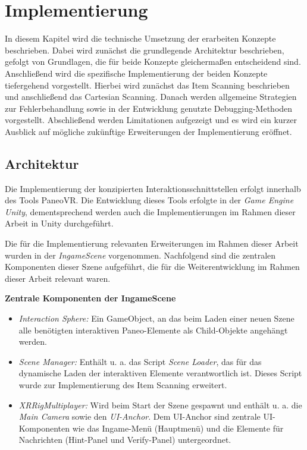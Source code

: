\chapter{Implementierung}
\label{chap:Implementierung}


In diesem Kapitel wird die technische Umsetzung der erarbeiten Konzepte beschrieben. Dabei wird zunächst die grundlegende Architektur beschrieben, gefolgt von Grundlagen, die für beide Konzepte gleichermaßen entscheidend sind. Anschließend wird die spezifische Implementierung der beiden Konzepte tiefergehend vorgestellt. Hierbei wird zunächst das Item Scanning beschrieben und anschließend das Cartesian Scanning. Danach werden allgemeine Strategien zur Fehlerbehandlung sowie in der Entwicklung genutzte Debugging-Methoden vorgestellt. Abschließend werden Limitationen aufgezeigt und es wird ein kurzer Ausblick auf mögliche zukünftige Erweiterungen der Implementierung eröffnet. 

\section{Architektur}
Die Implementierung der konzipierten Interaktionsschnittstellen erfolgt innerhalb des Tools PaneoVR. Die Entwicklung dieses Tools erfolgte in der \textit{Game Engine Unity}, dementsprechend werden auch die Implementierungen im Rahmen dieser Arbeit in Unity durchgeführt. 

Die für die Implementierung relevanten Erweiterungen im Rahmen dieser Arbeit wurden in der \textit{IngameScene} vorgenommen. Nachfolgend sind die zentralen Komponenten dieser Szene aufgeführt, die für die Weiterentwicklung im Rahmen dieser Arbeit relevant waren. 

{\normalfont \bfseries Zentrale Komponenten der IngameScene}

\begin{itemize}
    \item \textit{Interaction Sphere:} Ein GameObject, an das beim Laden einer neuen Szene alle benötigten interaktiven Paneo-Elemente als Child-Objekte angehängt werden.
    \item \textit{Scene Manager:} Enthält u. a. das Script \textit{Scene Loader}, das für das dynamische Laden der interaktiven Elemente verantwortlich ist. Dieses Script wurde zur Implementierung des Item Scanning erweitert. 
    \item \textit{XRRigMultiplayer:} Wird beim Start der Szene gespawnt und enthält u. a. die \textit{Main Camera} sowie den \textit{UI-Anchor}. Dem UI-Anchor sind zentrale UI-Komponenten wie das Ingame-Menü (Hauptmenü) und die Elemente für Nachrichten (Hint-Panel und Verify-Panel) untergeordnet.    
\end{itemize}

